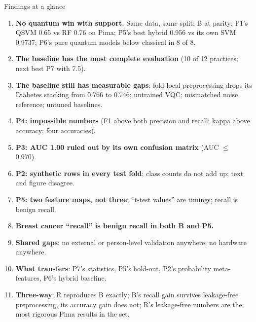 \documentclass[aspectratio=169,10pt,t,xcolor={table}]{beamer}
\newcommand{\bad}[1]{\textcolor{qred}{\textbf{#1}}}
\newcommand{\warn}[1]{\textcolor{qamber}{\textbf{#1}}}
\begin{document}
\begin{frame}{Findings at a glance}
\footnotesize
\begin{enumerate}
  \item \textbf{No quantum win with support.} Same data, same split: B at parity; P1's QSVM 0.65 vs RF 0.76 on Pima; P5's best hybrid 0.956 vs its own SVM 0.9737; P6's pure quantum models below classical in 8 of 8.
  \item \textbf{The baseline has the most complete evaluation} (10 of 12 practices; next best P7 with 7.5).
  \item \textbf{The baseline still has measurable gaps}: fold-local preprocessing drops its Diabetes stacking from 0.766 to 0.746; untrained VQC; mismatched noise reference; untuned baselines.
  \item \bad{P4: impossible numbers} (F1 above both precision and recall; kappa above accuracy; four accuracies).
  \item \bad{P3: AUC 1.00 ruled out by its own confusion matrix} (AUC $\le$ 0.970).
  \item \bad{P2: synthetic rows in every test fold}; class counts do not add up; text and figure disagree.
  \item \warn{P5: two feature maps, not three}; ``t-test values'' are timings; recall is benign recall.
  \item \warn{Breast cancer ``recall'' is benign recall in both B and P5.}
  \item \textbf{Shared gaps}: no external or person-level validation anywhere; no hardware anywhere.
  \item \textbf{What transfers}: P7's statistics, P5's hold-out, P2's probability meta-features, P6's hybrid baseline.
  \item \textbf{Three-way}: R reproduces B exactly; B's recall gain survives leakage-free preprocessing, its accuracy gain does not; R's leakage-free numbers are the most rigorous Pima results in the set.
\end{enumerate}
\end{frame}

\end{document}
